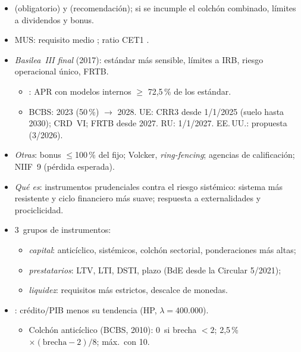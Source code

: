 \documentclass{article}
\begin{document}
\begin{columnas}
\begin{itemize}
\item {} (obligatorio) y  (recomendación); si se incumple el colchón combinado, límites a dividendos y bonus.
\item MUS: requisito medio ; ratio CET1 .
\item \emph{Basilea~III final} (2017): estándar más sensible, límites a IRB, riesgo operacional único, FRTB.
  \begin{itemize}
  \item {}: APR con modelos internos $\geq$ 72,5\,\% de los estándar.
  \item BCBS: 2023 (50\,\%) $\to$ 2028. UE: CRR3 desde 1/1/2025 (suelo hasta 2030); CRD~VI; FRTB desde 2027. RU: 1/1/2027. EE.\,UU.: propuesta (3/2026).
  \end{itemize}
\item \emph{Otras}: bonus $\leq$100\,\% del fijo; Volcker, \emph{ring-fencing}; agencias de calificación; NIIF~9 (pérdida esperada).
\end{itemize}
\begin{itemize}
\item \emph{Qué es}: instrumentos prudenciales contra el riesgo sistémico: sistema más resistente y ciclo financiero más suave; respuesta a externalidades y prociclicidad.
\item 3~grupos de instrumentos:
  \begin{itemize}
  \item \emph{capital}: anticíclico, sistémicos, colchón sectorial, ponderaciones más altas;
  \item \emph{prestatarios}: LTV, LTI, DSTI, plazo (BdE desde la Circular 5/2021);
  \item \emph{liquidez}: requisitos más estrictos, descalce de monedas.
  \end{itemize}
\item {}: crédito/PIB menos su tendencia (HP, $\lambda=400.000$).
  \begin{itemize}
  \item Colchón anticíclico (BCBS, 2010): 0~si brecha $<2$; 2,5\,\% $\times(\text{brecha}-2)/8$; máx.\ con 10.
  \end{itemize}
\end{itemize}

\end{columnas}
\end{document}
